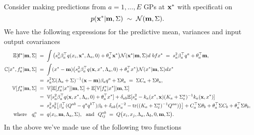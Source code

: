 \documentclass{article}
\newcommand{\bff}{{\bf f}}
\newcommand{\bfm}{{\bf m}}
\newcommand{\bfx}{{\bf x}}
\newcommand{\E}{{\mathbb E}}
\newcommand{\V}{{\mathbb V}}
\newcommand{\C}{{\mathbb C}}
\begin{document}
Consider making predictions from $a=1,\ldots,E$ GPs at $\bfx^*$ with specificati
on
\begin{equation}
p(\bfx^*|\bfm,\Sigma)\;\sim\;{\cal N}(\bfm, \Sigma).
\end{equation}
%
We have the following expressions for the predictive mean, variances
and input output covariances
\begin{align}
\E[\bff^*|\bfm,\Sigma]\;&=\;\int\big(s_a^2\beta_a^\top
q(x_i,\bfx^*,\Lambda_a,0)+\theta_a^\top\bfx^*\big){\cal N}(\bfx^*|\bfm,\Sigma)d\
bfx^*\;=\;s_a^2\beta_a^\top q^a+\theta_a^\top \bfm,\label{eq:m}\\
\C[x^*,f_a^*|\bfm,\Sigma]\;&=\;\int (x^*-\bfm)\big(s^2_a\beta_a^\top
q(\bfx,x^*,\Lambda_a,0)+\theta_a^\top x^*\big){\cal
  N}(x^*|\bfm,\Sigma)dx^*\nonumber\\
&=\;s^2_a\Sigma(\Lambda_a+\Sigma)^{-1}(\bfx-\bfm)\beta_aq^a+\Sigma\theta_a\;=\;
\Sigma C_a+\Sigma\theta_a,\label{eq:c}\\
\V[f_a^*|\bfm,\Sigma]\;&=\;\V[\E[f_a^*|x^*]|\bfm,\Sigma]+\E[\V[f_a^*|x^*]|\bfm,\Sigma]\nonumber\\
&=\;\V[s_a^2\beta_a^\top q(\bfx,x^*,\Lambda_a,0)+\theta_a^\top x^*]+\delta_{ab}\E[s_a^2-k_a(x^*,\bfx)(K_a+\Sigma_\varepsilon^a)^{-1}k_a(\bfx,x^*)]\label{eq:v}\\
&=\;s_a^2s_b^2\big[\beta_a^\top (Q^{ab}-q^aq^{b\top})\beta_b
+\delta_{ab}\big(s_a^{-2}-\operatorname{tr}((K_a+\Sigma_\varepsilon^a)^{-1}Q^{aa})\big)\big]
+C_a^\top\Sigma\theta_b+\theta_a^\top\Sigma C_b+\theta_a^\top\Sigma\theta_b,\nonumber\\
\text{\ \ where\ \ }\;q^a_i\;&=\;q(x_i,\bfm,\Lambda_a,\Sigma), \text{\ \ and\ \ }
Q^{ab}_{ij}\;=\;Q\big(x_i,x_j,\Lambda_a,\Lambda_b,0,\bfm,\Sigma\big).\nonumber
\end{align}
%
In the above we've made use of the following two functions
\end{document}
